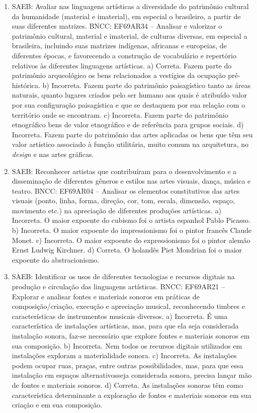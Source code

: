 \begin{enumerate}
\item
SAEB: Avaliar nas linguagens artísticas a diversidade do patrimônio
cultural da humanidade (material e imaterial), em especial o brasileiro,
a partir de suas diferentes matrizes.
BNCC: EF69AR34 -- Analisar e valorizar o patrimônio cultural, material e
imaterial, de culturas diversas, em especial a brasileira, incluindo
suas matrizes indígenas, africanas e europeias, de diferentes épocas, e
favorecendo a construção de vocabulário e repertório relativos às
diferentes linguagens artísticas.
a) Correta. Fazem parte do patrimônio arqueológico os bens relacionados a
  vestígios da ocupação pré-histórica.
b) Incorreta. Fazem parte do patrimônio paisagístico tanto as áreas
  naturais, quanto lugares criados pelo ser humano aos quais é atribuído
  valor por sua configuração paisagística e que se destaquem por sua
  relação com o território onde se encontram.
c) Incorreta. Fazem parte do patrimônio etnográfico bens de valor
  etnográfico e de referência para grupos sociais.
d) Incorreta. Fazem parte do patrimônio das artes aplicadas os bens que
  têm seu valor artístico associado à função utilitária, muito comum na
  arquitetura, no \textit{design} e nas artes gráficas.

\item
SAEB: Reconhecer artistas que contribuíram para o desenvolvimento e a
disseminação de diferentes gêneros e estilos nas artes visuais, dança,
música e teatro.
BNCC: EF69AR04 -- Analisar os elementos constitutivos das artes visuais
(ponto, linha, forma, direção, cor, tom, escala, dimensão, espaço,
movimento etc.) na apreciação de diferentes produções artísticas.
a) Incorreta. O maior expoente do cubismo foi o artista espanhol Pablo Picasso.
b) Incorreta. O maior expoente do impressionismo foi o pintor francês Claude Monet.
c) Incorreta. O maior expoente do expressionismo foi o pintor alemão Ernst Ludwig Kirchner.
d) Correta. O holandês Piet Mondrian foi o maior expoente do abstracionismo.

\item
SAEB: Identificar os usos de diferentes tecnologias e recursos
digitais na produção e circulação das linguagens artísticas.
BNCC: EF69AR21 -- Explorar e analisar fontes e materiais sonoros em
práticas de composição/criação, execução e apreciação musical,
reconhecendo timbres e características de instrumentos musicais
diversos.
a) Incorreta. É uma característica de instalações artísticas, mas, para
  que ela seja considerada instalação sonora, faz-se necessário que explore fontes e materiais sonoros em 
  sua composição.
b) Incorreta. Nem todos os recursos digitais utilizados em instalações
  exploram a materialidade sonora.
c) Incorreta. As instalações podem ocupar ruas, praças, entre outras
  possibilidades, mas, para que essa instalação em espaços
  alternativosseja considerada sonora, precisa lançar mão de fontes
  e materiais sonoros.
d) Correta. As instalações sonoras têm como
  característica determinante a exploração de fontes e materiais sonoros
  em sua criação e em sua composição.


\end{enumerate}
